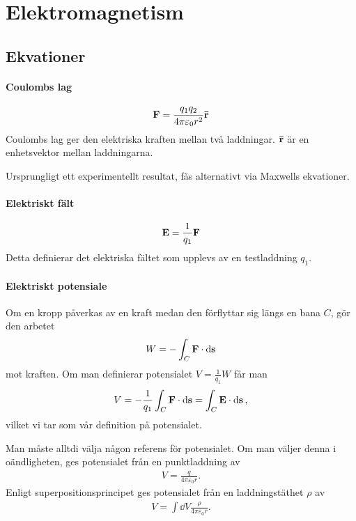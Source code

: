 \section{Elektromagnetism}

\subsection{Ekvationer}

\paragraph{Coulombs lag}
\begin{align*}
	\vect{F} = \frac{q_1q_2}{4\pi\varepsilon_0 r^2}\vect{\bar{r}}
\end{align*}
Coulombs lag ger den elektriska kraften mellan två laddningar. $\vect{\bar{r}}$ är en enhetsvektor mellan laddningarna.

\deriv
Ursprungligt ett experimentellt resultat, fås alternativt via Maxwells ekvationer.

\paragraph{Elektriskt fält}
\begin{align*}
	\vect{E} = \frac{1}{q_1}\vect{F}
\end{align*}
Detta definierar det elektriska fältet som upplevs av en testladdning $q_1$.

\paragraph{Elektriskt potensiale}
Om en kropp påverkas av en kraft medan den förflyttar sig längs en bana $C$, gör den arbetet
\begin{align*}
	W = -\int_{C}\vect{F}\cdot\dd{\vect{s}}
\end{align*}
mot kraften. Om man definierar potensialet $V = \frac{1}{q_1}W$ får man
\begin{align*}
	V = -\frac{1}{q_1}\int_{C}\vect{F}\cdot\dd{\vect{s}} = \int_{C}\vect{E}\cdot\dd{\vect{s}},
\end{align*}
vilket vi tar som vår definition på potensialet.

Man måste alltdi välja någon referens för potensialet. Om man väljer denna i oändligheten, ges potensialet från en punktladdning av
\begin{align*}
	V = \frac{q}{4\pi\varepsilon_0 r}.
\end{align*}
Enligt superpositionsprincipet ges potensialet från en laddningstäthet $\rho$ av
\begin{align*}
	V = \int\dd{V}\frac{\rho}{4\pi\varepsilon_0 r}.
\end{align*}

